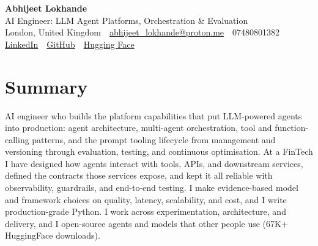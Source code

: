 \documentclass[10pt,a4paper]{article}
\newcommand{\sep}{\,\textcolor{accent!60}{\textbar}\,}
\begin{document}
\begin{center}
  {\fontsize{24}{26}\selectfont\bfseries Abhijeet Lokhande}\\[3pt]
  {\color{accent}\large AI Engineer: LLM Agent Platforms, Orchestration \& Evaluation}\\[5pt]
  {\small
    London, United Kingdom \sep
    \href{mailto:abhijeet_lokhande@proton.me}{abhijeet\_lokhande@proton.me} \sep
    07480801382 \\[2pt]
    \href{https://www.linkedin.com/in/ablds/}{LinkedIn} \sep
    \href{https://github.com/abhijeetscode}{GitHub} \sep
    \href{https://huggingface.co/ab-ai}{Hugging Face}
  }
\end{center}
\vspace{2pt}

\section{Summary}
AI engineer who builds the platform capabilities that put LLM-powered agents into production: agent architecture, multi-agent orchestration, tool and function-calling patterns, and the prompt tooling lifecycle from management and versioning through evaluation, testing, and continuous optimisation. At a FinTech I have designed how agents interact with tools, APIs, and downstream services, defined the contracts those services expose, and kept it all reliable with observability, guardrails, and end-to-end testing. I make evidence-based model and framework choices on quality, latency, scalability, and cost, and I write production-grade Python. I work across experimentation, architecture, and delivery, and I open-source agents and models that other people use (67K+ HuggingFace downloads).

\end{document}
